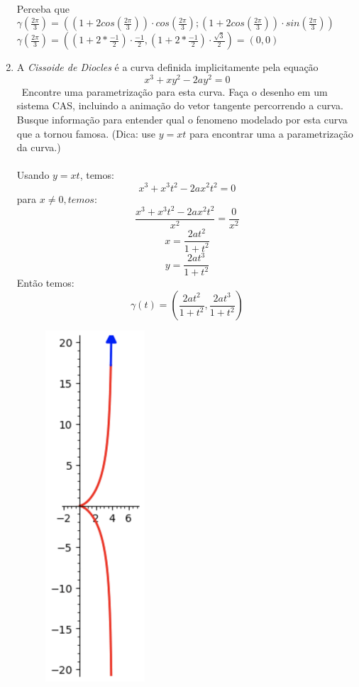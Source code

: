 \documentclass{article}
\begin{document}
\begin{enumerate}
\begin{figure}[!h]
        \end{figure}
        \\ Perceba que $\gamma(\frac{2\pi}{3}) = ((1+2cos(\frac{2\pi}{3})) \cdot cos(\frac{2\pi}{3}); (1+2cos(\frac{2\pi}{3})) \cdot sin(\frac{2\pi}{3})) $\\
        $\gamma(\frac{2\pi}{3}) = ((1+2*\frac{-1}{2})\cdot\frac{-1}{2}, (1+2*\frac{-1}{2})\cdot\frac{\sqrt{3}}{2}) = (0, 0) $ \\
    \item A \textit{Cissoide de Diocles} é a curva definida implicitamente pela equação \
        $$x^3+xy^2-2ay^2=0$$ \
        Encontre uma parametrização para esta curva. Faça o desenho em um sistema CAS, incluindo a animação do vetor tangente percorrendo a curva. Busque informação para entender qual o fenomeno modelado por esta curva que a tornou famosa. (Dica: use $y = xt$ para encontrar uma a parametrização da curva.) \\
        \\
        Usando $y = xt$, temos:
            $$ x^3 + x^3t^2 - 2ax^2t^2 = 0 $$
            para $x \neq 0, temos:$
            $$ \frac{x^3 + x^3t^2 - 2ax^2t^2}{x^2} = \frac{0}{x^2} $$
            $$ x = \frac{2at^2}{1+t^2} $$
            $$ y = \frac{2at^3}{1+t^2} $$
            Então temos:
            $$\gamma(t) = (\frac{2at^2}{1+t^2}, \frac{2at^3}{1+t^2})$$
            \begin{figure}[!h]
                \centering
                \includegraphics[width=0.35\textwidth]{cissoide_de_diocles.png}

\end{figure}
\end{enumerate}
\end{document}
